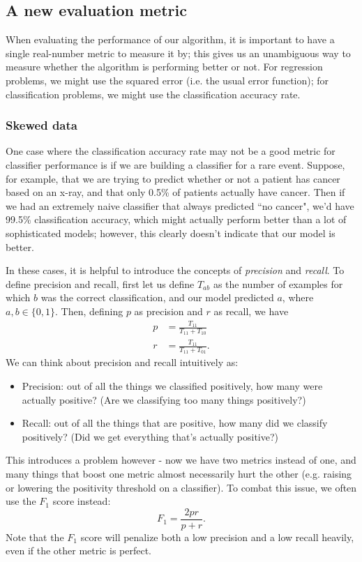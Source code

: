 \documentclass{article}
\begin{document}
\subsection{A new evaluation metric}

When evaluating the performance of our algorithm, it is important to have a single real-number metric to measure it by; this gives us an unambiguous way to measure whether the algorithm is performing better or not. For regression problems, we might use the squared error (i.e. the usual error function); for classification problems, we might use the classification accuracy rate.

\subsubsection{Skewed data}
One case where the classification accuracy rate may not be a good metric for classifier performance is if we are building a classifier for a rare event. Suppose, for example, that we are trying to predict whether or not a patient has cancer based on an x-ray, and that only 0.5\% of patients actually have cancer. Then if we had an extremely naive classifier that always predicted ``no cancer", we'd have 99.5\% classification accuracy, which might actually perform better than a lot of sophisticated models; however, this clearly doesn't indicate that our model is better.

In these cases, it is helpful to introduce the concepts of \emph{precision} and \emph{recall}. To define precision and recall, first let us define $T_{ab}$ as the number of examples for which $b$ was the correct classification, and our model predicted $a$, where $a, b \in \{0, 1\}$. Then, defining $p$ as precision and $r$ as recall, we have
\begin{align*}
p &= \frac{T_{11}}{T_{11} + T_{10}}\\
r &= \frac{T_{11}}{T_{11} + T_{01}}.
\end{align*}
We can think about precision and recall intuitively as:
\begin{itemize}
\item Precision: out of all the things we classified positively, how many were actually positive? (Are we classifying too many things positively?)
\item Recall: out of all the things that are positive, how many did we classify positively? (Did we get everything that's actually positive?)
\end{itemize}
This introduces a problem however - now we have two metrics instead of one, and many things that boost one metric almost necessarily hurt the other (e.g. raising or lowering the positivity threshold on a classifier). To combat this issue, we often use the $F_1$ score instead:
$$F_1 = \frac{2pr}{p + r}.$$
Note that the $F_1$ score will penalize both a low precision and a low recall heavily, even if the other metric is perfect.
\end{document}
